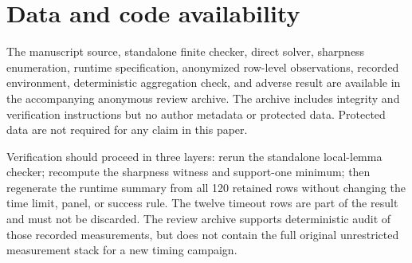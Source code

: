 \section{Data and code availability}

The manuscript source, standalone finite checker, direct solver, sharpness enumeration, runtime specification, anonymized row-level observations, recorded environment, deterministic aggregation check, and adverse result are available in the accompanying anonymous review archive. The archive includes integrity and verification instructions but no author metadata or protected data. Protected data are not required for any claim in this paper.

Verification should proceed in three layers: rerun the standalone local-lemma checker; recompute the sharpness witness and support-one minimum; then regenerate the runtime summary from all 120 retained rows without changing the time limit, panel, or success rule. The twelve timeout rows are part of the result and must not be discarded. The review archive supports deterministic audit of those recorded measurements, but does not contain the full original unrestricted measurement stack for a new timing campaign.
